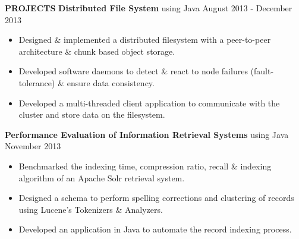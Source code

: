 \documentclass[10pt, letterpaper]{article}
\begin{document}
\textbf{PROJECTS}
\smallskip 
\newline
\textbf{Distributed File System} using Java \hfill August 2013 - December 2013
\begin{itemize}
    \item Designed \& implemented a distributed filesystem with a peer-to-peer 
architecture \& chunk based object storage.
    \item Developed software daemons to detect \& react to node failures (fault-tolerance) \& ensure data consistency.  
    \item Developed a multi-threaded client application to communicate with the cluster and store data on the filesystem.
\end{itemize}

\textbf{Performance Evaluation of Information Retrieval Systems} using Java \hfill November 2013
\begin{itemize}
    \item Benchmarked the indexing time, compression ratio, recall \& indexing 
algorithm of an Apache Solr retrieval system.
    \item Designed a schema to perform spelling corrections and clustering of 
records using Lucene's Tokenizers \& Analyzers.
    \item Developed an application in Java to automate the record indexing process.
\end{itemize}

\end{document}
